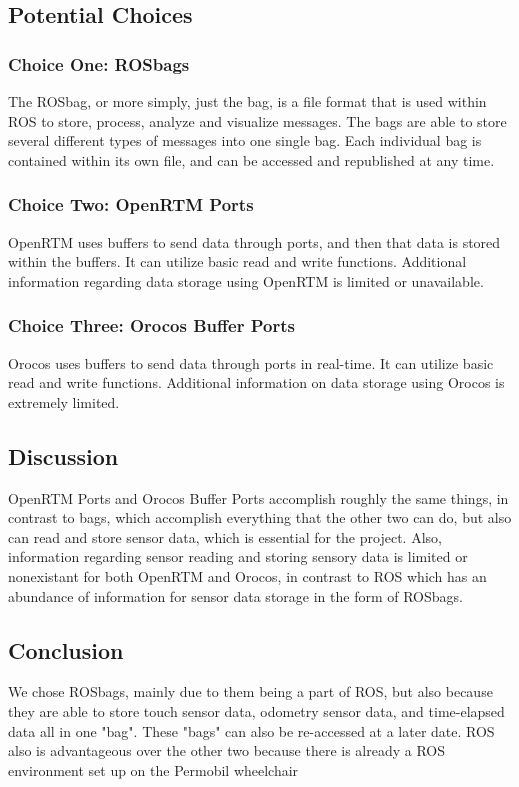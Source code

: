 \documentclass[onecolumn, draftclsnofoot,10pt, compsoc]{IEEEtran}
\begin{document}
\subsection{Potential Choices}
\subsubsection{Choice One: ROSbags}
The ROSbag, or more simply, just the bag, is a file format that is used within ROS to store, process, analyze and visualize messages. The bags are able to store several different types of messages into one single bag. Each individual bag is contained within its own file, and can be accessed and republished at any time.\cite{Bags}

\subsubsection{Choice Two: OpenRTM Ports}
OpenRTM uses buffers to send data through ports, and then that data is stored within the buffers. It can utilize basic read and write functions. Additional information regarding data storage using OpenRTM is limited or unavailable.\cite{OpenRTM_Development}

\subsubsection{Choice Three: Orocos Buffer Ports}
Orocos uses buffers to send data through ports in real-time. It can utilize basic read and write functions. Additional information on data storage using Orocos is extremely limited.\cite{RTT_Data_Ports}

\subsection{Discussion}
OpenRTM Ports and Orocos Buffer Ports accomplish roughly the same things, in contrast to bags, which accomplish everything that the other two can do, but also can read and store sensor data, which is essential for the project. Also, information regarding sensor reading and storing sensory data is limited or nonexistant for both OpenRTM and Orocos, in contrast to ROS which has an abundance of information for sensor data storage in the form of ROSbags.

\subsection{Conclusion}
We chose ROSbags, mainly due to them being a part of ROS, but also because they are able to store touch sensor data, odometry sensor data, and time-elapsed data all in one "bag". These "bags" can also be re-accessed at a later date. ROS also is advantageous over the other two because there is already a ROS environment set up on the Permobil wheelchair
\end{document}
